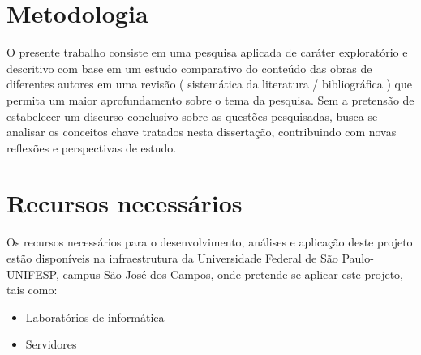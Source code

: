 \documentclass[quali]{mpit}
\begin{document}
\section{Metodologia}
O presente trabalho consiste em uma pesquisa aplicada de caráter exploratório e descritivo com base em um estudo comparativo do conteúdo das obras de diferentes autores em uma revisão ( sistemática da literatura / bibliográfica ) que
permita um maior aprofundamento sobre o tema da pesquisa. Sem a pretensão de
estabelecer um discurso conclusivo sobre as questões pesquisadas, busca-se analisar
os conceitos chave tratados nesta dissertação, contribuindo com novas reflexões e 
perspectivas de estudo.

\section{Recursos necessários}
Os recursos necessários para o desenvolvimento, análises  e aplicação deste projeto estão disponíveis na infraestrutura da Universidade Federal de São Paulo-UNIFESP, campus São José dos Campos, onde pretende-se aplicar este projeto, tais como:
\begin{itemize}
\item Laboratórios de informática 
\item Servidores
\end{itemize}




\end{document}
